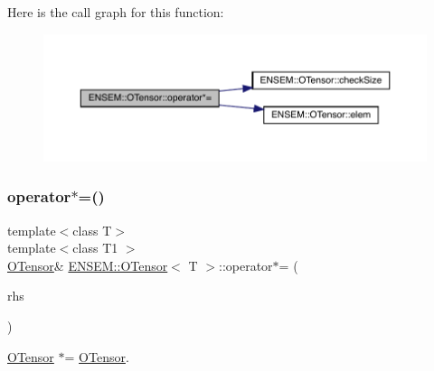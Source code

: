 Here is the call graph for this function\+:
\nopagebreak
\begin{figure}[H]
\begin{center}
\leavevmode
\includegraphics[width=350pt]{da/d8a/classENSEM_1_1OTensor_a6edba72b265fa3629417ad85c9ae1477_cgraph}
\end{center}
\end{figure}
\mbox{\label{classENSEM_1_1OTensor_a6edba72b265fa3629417ad85c9ae1477}} 
\subsubsection{\texorpdfstring{operator$\ast$=()}{operator*=()}\hspace{0.1cm}{\footnotesize\ttfamily [5/6]}}
{\footnotesize\ttfamily template$<$class T$>$ \\
template$<$class T1 $>$ \\
\mbox{\hyperlink{classENSEM_1_1OTensor}{O\+Tensor}}\& \mbox{\hyperlink{classENSEM_1_1OTensor}{E\+N\+S\+E\+M\+::\+O\+Tensor}}$<$ T $>$\+::operator$\ast$= (\begin{DoxyParamCaption}\item[{const \mbox{\hyperlink{classENSEM_1_1OTensor}{O\+Tensor}}$<$ T1 $>$ \&}]{rhs }\end{DoxyParamCaption})\hspace{0.3cm}{\ttfamily [inline]}}



\mbox{\hyperlink{classENSEM_1_1OTensor}{O\+Tensor}} $\ast$= \mbox{\hyperlink{classENSEM_1_1OTensor}{O\+Tensor}}. 

